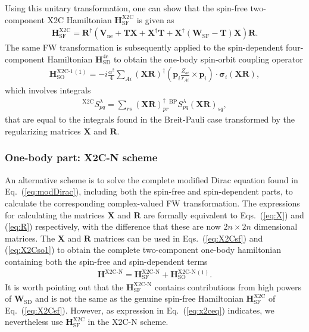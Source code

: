 \documentclass[10pt,aps,prb,twocolumn,amsmath,amssymb,superscriptaddress]{revtex4-1}
\renewcommand\b[1]{\ensuremath{\mathbf{#1}}}
\newcommand\B[1]  {\ensuremath{\pmb #1}}
\begin{document}
Using this unitary transformation, one can show that the spin-free two-component X2C Hamiltonian $\b{H}^\text{X2C}_\text{SF}$ is given as
\begin{align}
    \b{H}^\text{X2C}_\text{SF} = \b{R}^\dag (\b{V}_\text{ne} + \b{T}\b{X} + \b{X}^\dag \b{T} + \b{X}^\dag (\b{W}_\text{SF} - \b{T}) \b{X})\b{R} \label{eq:X2Csf}
.\end{align}
The same FW transformation is subsequently applied to the spin-dependent four-component Hamiltonian $\b{H}^\text{4c}_\text{SD}$ to obtain the one-body spin-orbit coupling operator
\begin{align}
    \b{H}^\text{X2C-1}_\text{SO}{}^{(1)} = -i\frac{\alpha^2}{4} \sum_{Ai} (\b{X}\b{R})^\dag\left(\b{p}_i \frac{Z_{ai}}{r_{Ai}} \times\b{p}_i\right)\cdot \B{\sigma}_i (\b{X}\b{R}) \label{eq:X2Cso1}
,\end{align}
which involves integrals
\begin{align}
    \label{eq:Sx2c}
    {}^\text{X2C}\!S_{pq}^\lambda=\sum_{rs}(\b{X}\b{R})^\dag_{pr}
    {}^\text{BP}\!S_{pq}^\lambda
    (\b{X}\b{R})_{sq}
,\end{align}
that are equal to the integrals found in the Breit-Pauli case transformed by the regularizing matrices $\b{X}$ and $\b{R}$.

\subsubsection{One-body part: X2C-N scheme}
An alternative scheme is to solve the complete modified Dirac equation found in Eq.~(\ref{eq:modDirac}), including both the spin-free and spin-dependent parts, to calculate the corresponding complex-valued FW transformation. The expressions for calculating the matrices $\b{X}$ and $\b{R}$ are formally equivalent to Eqs.~(\ref{eq:X}) and (\ref{eq:R}) respectively, with the difference that these are now $2n\times 2n$ dimensional matrices. The $\b{X}$ and $\b{R}$ matrices can be used in Eqs.~(\ref{eq:X2Csf}) and (\ref{eq:X2Cso1}) to obtain the complete two-component one-body hamiltonian containing both the spin-free and spin-dependent terms
\begin{align}
    \b{H}^{\text{X2C-N}} = \b{H}^{\text{X2C-N}}_{\text{SF}} + \b{H}^{\text{X2C-N}}_\text{SO}{}^{(1)}.\label{eq:X2Cson}
\end{align}
It is worth pointing out that the $\b{H}^{\text{X2C-N}}_{\text{SF}}$ contains contributions from high powers of $\b{W}_\text{SD}$ and is not the same as the genuine spin-free Hamiltonian $\b{H}^{\text{X2C}}_{\text{SF}}$ of Eq.~(\ref{eq:X2Csf}). However, as expression in Eq.~(\ref{eq:x2ceq}) indicates, we nevertheless use $\b{H}^{\text{X2C}}_{\text{SF}}$ in the X2C-N scheme. 
\end{document}
